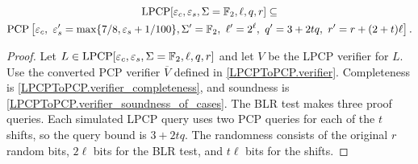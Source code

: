 \begin{lemma}
\label{LPCP_to_PCP_ZMod2}
\leanok
\begin{gather*}
\mathrm{LPCP}[\varepsilon_c,\varepsilon_s,\Sigma=\mathbb{F}_{2},\ell,q,r] \subseteq\\
\mathrm{PCP}\left[
\varepsilon_c,\
\varepsilon_s'=\max\{7/8,\varepsilon_s+1/100\},
\Sigma'=\mathbb{F}_{2},\
\ell'=2^{\ell},\
q'=3+2tq,\
r'=r+(2+t)\ell
\right].
\end{gather*}
\end{lemma}
\begin{proof}\leanok
Let $L \in \mathrm{LPCP}[\varepsilon_c,\varepsilon_s,\Sigma=\mathbb{F}_{2},\ell,q,r]$ and let $V$ be the LPCP verifier for $L$. Use the converted PCP verifier $\overline V$ defined in \ref{LPCPToPCP.verifier}.
Completeness is
\ref{LPCPToPCP.verifier_completeness}, and soundness is
\ref{LPCPToPCP.verifier_soundness_of_cases}. The BLR test makes three proof
queries. Each simulated LPCP query uses two PCP queries for each of the \(t\)
shifts, so the query bound is \(3+2tq\). The randomness consists of the
original \(r\) random bits, \(2\ell\) bits for the BLR test, and \(t\ell\) bits
for the shifts.
\end{proof}
